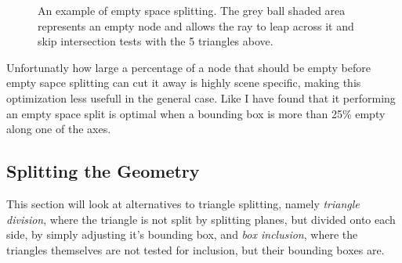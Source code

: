 \begin{figure}
  \centering
  \caption{An example of empty space splitting. The grey ball shaded
    area represents an empty node and allows the ray to leap across it
    and skip intersection tests with the 5 triangles above.}
  \label{fig:emptySpaceExample}
\end{figure}


Unfortunatly how large a percentage of a node that should be empty
before empty sapce splitting can cut it away is highly scene specific,
making this optimization less usefull in the general case. Like \zhou
I have found that it performing an empty space split is optimal when a
bounding box is more than 25\% empty along one of the axes.




\subsection{Splitting the Geometry}\label{sec:splittingGeom}

This section will look at alternatives to triangle splitting, namely
\textit{triangle division}, where the triangle is not split by
splitting planes, but divided onto each side, by simply adjusting it's
bounding box, and \textit{box inclusion}, where the triangles
themselves are not tested for inclusion, but their bounding boxes are.


